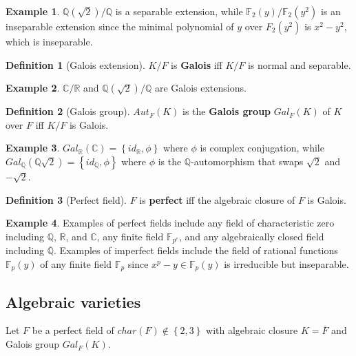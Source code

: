 \documentclass{article}
\newcommand{\F}{\mathbb{F}}
\newcommand{\Q}{\mathbb{Q}}
\newcommand{\R}{\mathbb{R}}
\newcommand{\C}{\mathbb{C}}
\newcommand{\rb}[1]{\left( #1 \right)}
\newcommand{\cb}[1]{\left\{ #1 \right\}}
\theoremstyle{definition}
\newtheorem*{definition}{Definition}
\newtheorem*{example}{Example}
\begin{document}
\begin{example}
$ \Q\rb{\sqrt{2}} / \Q $ is a separable extension, while $ \F_2\rb{y} / \F_2\rb{y^2} $ is an inseparable extension since the minimal polynomial of $ y $ over $ F_2\rb{y^2} $ is $ x^2 - y^2 $, which is inseparable.
\end{example}

\begin{definition}[Galois extension]
$ K / F $ is \textbf{Galois} iff $ K / F $ is normal and separable.
\end{definition}

\begin{example}
$ \C / \R $ and $ \Q\rb{\sqrt{2}} / \Q $ are Galois extensions.
\end{example}

\begin{definition}[Galois group]
$ Aut_F\rb{K} $ is the \textbf{Galois group} $ Gal_F\rb{K} $ of $ K $ over $ F $ iff $ K / F $ is Galois.
\end{definition}

\begin{example}
$ Gal_\R\rb{\C} = \cb{id_\R, \phi} $ where $ \phi $ is complex conjugation, while $ Gal_\Q\rb{\Q\sqrt{2}} = \cb{id_\Q, \phi} $ where $ \phi $ is the $ \Q $-automorphism that swaps $ \sqrt{2} $ and $ -\sqrt{2} $.
\end{example}

\begin{definition}[Perfect field]
$ F $ is \textbf{perfect} iff the algebraic closure of $ F $ is Galois.
\end{definition}

\begin{example}
Examples of perfect fields include any field of characteristic zero including $ \Q $, $ \R $, and $ \C $, any finite field $ \F_{p^e} $, and any algebraically closed field including $ \overline{\Q} $. Examples of imperfect fields include the field of rational functions $ \F_p\rb{y} $ of any finite field $ \F_p $ since $ x^p - y \in \F_p\rb{y} $ is irreducible but inseparable.
\end{example}

\pagebreak

\subsection{Algebraic varieties}

Let $ F $ be a perfect field of $ char\rb{F} \notin \cb{2, 3} $ with algebraic closure $ K = \overline{F} $ and Galois group $ Gal_F\rb{K} $.
\end{document}
